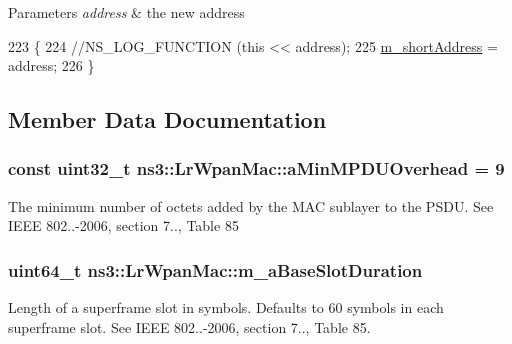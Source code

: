 \begin{DoxyParams}{Parameters}
{\em address} & the new address \\
\hline
\end{DoxyParams}

\begin{DoxyCode}
223 \{
224   \textcolor{comment}{//NS\_LOG\_FUNCTION (this << address);}
225   \hyperlink{classns3_1_1LrWpanMac_a6886e840ca3a1986b93db966c58ed415}{m\_shortAddress} = address;
226 \}
\end{DoxyCode}


\subsection{Member Data Documentation}
\subsubsection[{\texorpdfstring{a\+Min\+M\+P\+D\+U\+Overhead}{aMinMPDUOverhead}}]{\setlength{\rightskip}{0pt plus 5cm}const uint32\+\_\+t ns3\+::\+Lr\+Wpan\+Mac\+::a\+Min\+M\+P\+D\+U\+Overhead = 9\hspace{0.3cm}{\ttfamily [static]}}\hypertarget{classns3_1_1LrWpanMac_a49d8579fb79ba7a3a4eed04a375380c5}{}\label{classns3_1_1LrWpanMac_a49d8579fb79ba7a3a4eed04a375380c5}
The minimum number of octets added by the M\+AC sublayer to the P\+S\+DU. See I\+E\+EE 802..-\/2006, section 7.., Table 85 
\subsubsection[{\texorpdfstring{m\+\_\+a\+Base\+Slot\+Duration}{m_aBaseSlotDuration}}]{\setlength{\rightskip}{0pt plus 5cm}uint64\+\_\+t ns3\+::\+Lr\+Wpan\+Mac\+::m\+\_\+a\+Base\+Slot\+Duration}\hypertarget{classns3_1_1LrWpanMac_aad2f54fa13df968bd5961770e76d6797}{}\label{classns3_1_1LrWpanMac_aad2f54fa13df968bd5961770e76d6797}
Length of a superframe slot in symbols. Defaults to 60 symbols in each superframe slot. See I\+E\+EE 802..-\/2006, section 7.., Table 85. 
